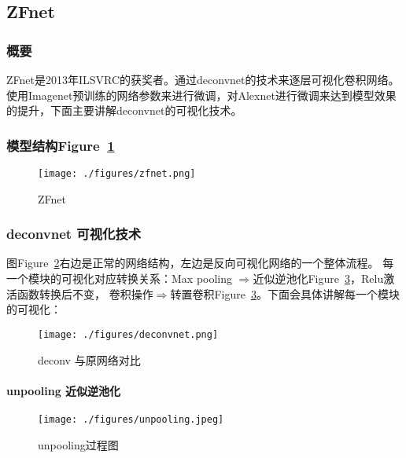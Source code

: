 \documentclass{article}
\newcommand{\tao}[1]{\todo[color=red!20,size=\footnotesize]{T: #1}{}}
\begin{document}
\begin{CJK}{UTF8}{gbsn}
\subsection{ZFnet}
\subsubsection{概要}
ZFnet是2013年ILSVRC的获奖者。通过deconvnet的技术来逐层可视化卷积网络。使用Imagenet预训练的网络参数来进行微调，对Alexnet进行微调来达到模型效果的提升，下面主要讲解deconvnet的可视化技术。


\subsubsection{模型结构Figure~\ref{fig:zfnet}}
\begin{figure}[!h]
    \centering
    \texttt{[image: ./figures/zfnet.png]}
    \caption{ZFnet}
    \label{fig:zfnet}
\end{figure}


\subsubsection{deconvnet 可视化技术}
图Figure~\ref{fig:deconvnet}右边是正常的网络结构，左边是反向可视化网络的一个整体流程。
每一个模块的可视化对应转换关系：Max pooling $\Rightarrow$近似逆池化Figure~\ref{fig:unpooling}，Relu激活函数转换后不变，
卷积操作$\Rightarrow$转置卷积Figure~\ref{fig:unpooling}。下面会具体讲解每一个模块的可视化：
\begin{figure}[!h]
    \centering
    \texttt{[image: ./figures/deconvnet.png]}
    \caption{deconv 与原网络对比}
    \label{fig:deconvnet}
\end{figure}


\paragraph{unpooling 近似逆池化}
\begin{figure}[!h]
    \centering
    \texttt{[image: ./figures/unpooling.jpeg]}
    \caption{unpooling过程图}
    \label{fig:unpooling}
\end{figure}


\end{CJK}
\end{document}
